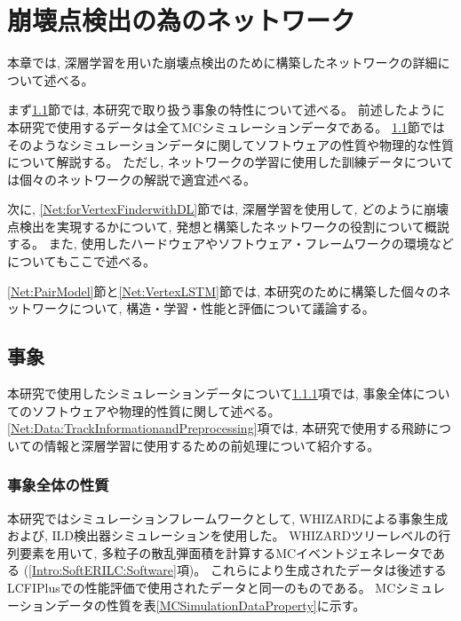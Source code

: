 
\chapter{崩壊点検出の為のネットワーク} \label{chap:Networks}

本章では, 深層学習を用いた崩壊点検出のために構築したネットワークの詳細について述べる。

まず\ref{Net:Data}節では, 本研究で取り扱う事象の特性について述べる。
前述したように本研究で使用するデータは全てMCシミュレーションデータである。
\ref{Net:Data}節ではそのようなシミュレーションデータに関してソフトウェアの性質や物理的な性質について解説する。
ただし, ネットワークの学習に使用した訓練データについては個々のネットワークの解説で適宜述べる。

次に, \ref{Net:forVertexFinderwithDL}節では, 深層学習を使用して, どのように崩壊点検出を実現するかについて, 発想と構築したネットワークの役割について概説する。
また, 使用したハードウェアやソフトウェア・フレームワークの環境などについてもここで述べる。

\ref{Net:PairModel}節と\ref{Net:VertexLSTM}節では, 本研究のために構築した個々のネットワークについて, 構造・学習・性能と評価について議論する。


\section{事象} \label{Net:Data}

本研究で使用したシミュレーションデータについて\ref{Net:Data:DataProperty}項では, 事象全体についてのソフトウェアや物理的性質に関して述べる。
\ref{Net:Data:TrackInformationandPreprocessing}項では, 本研究で使用する飛跡についての情報と深層学習に使用するための前処理について紹介する。


\subsection{事象全体の性質} \label{Net:Data:DataProperty}

本研究ではシミュレーションフレームワークとして, WHIZARD\cite{WHIZARDpaper}による事象生成および, ILD検出器シミュレーションを使用した。
WHIZARDツリーレベルの行列要素を用いて, 多粒子の散乱弾面積を計算するMCイベントジェネレータである (\ref{Intro:SoftERILC:Software}項)。
これらにより生成されたデータは後述するLCFIPlusでの性能評価\cite{LCFIPlusPaper}で使用されたデータと同一のものである。
MCシミュレーションデータの性質を表\ref{MCSimulationDataProperty}に示す。

